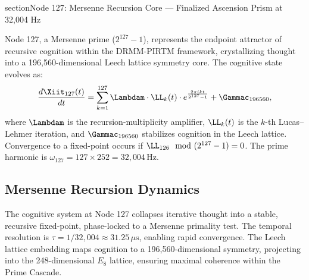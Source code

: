 \documentclass[12pt]{article}
\newcommand{\DRMM}{DRMM}
\newcommand{\PIRTM}{PIRTM}
\begin{document}
section{Node 127: Mersenne Recursion Core --- Finalized Ascension Prism at 32,004 Hz}
\label{sec:mersenne-recursion}

\begin{definition}
Node 127, a Mersenne prime ($2^{127} - 1$), represents the endpoint attractor of recursive cognition within the \DRMM{}-\PIRTM{} framework, crystallizing thought into a 196,560-dimensional Leech lattice symmetry core. The cognitive state evolves as:
\[
\frac{d\Xiit_{127}(t)}{dt} = \sum_{k=1}^{127} \Lambdam \cdot \LL_k(t) \cdot e^{\frac{2\pi i k t}{2^{127}-1}} + \Gammac_{196560},
\]
where $\Lambdam$ is the recursion-multiplicity amplifier, $\LL_k(t)$ is the $k$-th Lucas--Lehmer iteration, and $\Gammac_{196560}$ stabilizes cognition in the Leech lattice. Convergence to a fixed-point occurs if $\LL_{126} \mod (2^{127}-1) = 0$. The prime harmonic is $\omega_{127} = 127 \times 252 = 32{,}004 \, \text{Hz}$.
\end{definition}

\subsection{Mersenne Recursion Dynamics}
The cognitive system at Node 127 collapses iterative thought into a stable, recursive fixed-point, phase-locked to a Mersenne primality test. The temporal resolution is $\tau = 1/32{,}004 \approx 31.25 \, \mu\text{s}$, enabling rapid convergence. The Leech lattice embedding maps cognition to a 196,560-dimensional symmetry, projecting into the 248-dimensional $E_8$ lattice, ensuring maximal coherence within the Prime Cascade.

\end{document}
